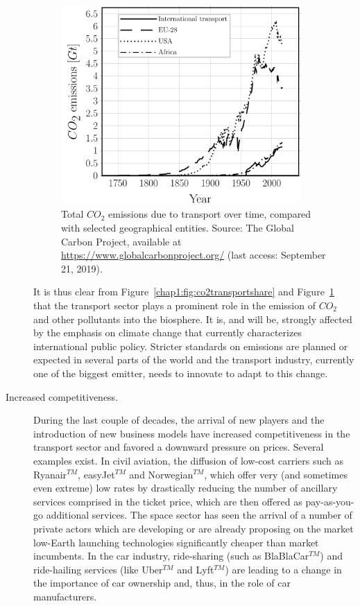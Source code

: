 \begin{description}
\begin{figure}[!h]
\includegraphics[width=0.9\textwidth]{pics/co2transportabsolute.pdf}
\caption{Total $CO_{2}$ emissions due to transport over time, compared with selected geographical entities. Source: The Global Carbon Project, available at \href{https://www.globalcarbonproject.org/}{https://www.globalcarbonproject.org/} (last access: September 21, 2019).}\label{chap1:fig:co2transportabsolute}
\end{figure}

It is thus clear from Figure~\ref{chap1:fig:co2transportshare} and Figure~\ref{chap1:fig:co2transportabsolute} that the transport sector plays a prominent role in the emission of $CO_{2}$ and other pollutants into the biosphere. It is, and will be, strongly affected by the emphasis on climate change that currently characterizes international public policy. Stricter standards on emissions are planned or expected in several parts of the world and the transport industry, currently one of the biggest emitter, needs to innovate to adapt to this change.

\item[Increased competitiveness.] During the last couple of decades, the arrival of new players and the introduction of new business models have increased competitiveness in the transport sector and favored a downward pressure on prices. Several examples exist. In civil aviation, the diffusion of low-cost carriers such as Ryanair$^{TM}$, easyJet$^{TM}$ and Norwegian$^{TM}$, which offer very (and sometimes even extreme) low rates by drastically reducing the number of ancillary services comprised in the ticket price, which are then offered as pay-as-you-go additional services. The space sector has seen the arrival of a number of private actors which are developing or are already proposing on the market low-Earth launching technologies significantly cheaper than market incumbents. In the car industry, ride-sharing (such as BlaBlaCar$^{TM}$) and ride-hailing services (like Uber$^{TM}$ and Lyft$^{TM}$) are leading to a change in the importance of car ownership and, thus, in the role of car manufacturers.


\end{description}
